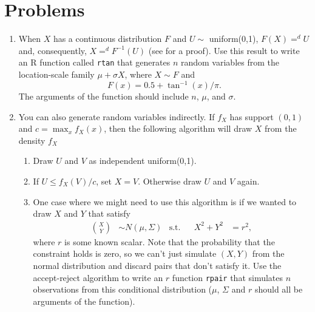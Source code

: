 

\chapter{Problems}

\begin{enumerate}

\item When $X$ has a continuous distribution $F$ and $U \sim$
  uniform(0,1), $F(X) =^d U$ and, consequently, $X =^d F^{-1}(U)$ (see
  \citealt[Theorem 2.1.10]{CB02} for a proof).  Use this result to
  write an R function called \texttt{rtan} that generates $n$ random
  variables from the location-scale family $\mu + \sigma X$, where $X
  \sim F$ and
  \begin{equation*}
    F(x) = 0.5 + \tan^{-1}(x)/\pi.
  \end{equation*}
  The arguments of the function should include $n$, $\mu$, and $\sigma$.

\item You can also generate random variables indirectly.  If $f_X$ has
  support $(0,1)$ and $c = \max_x f_X(x)$, then the following
  algorithm will draw $X$ from the density $f_X$ \citep[see][Section
  5.6.2]{CB02}
  \begin{enumerate}
  \item Draw $U$ and $V$ as independent uniform(0,1).
  \item If $U \leq f_X(V) / c$, set $X = V$.  Otherwise draw $U$ and $V$
    again.
  \item One case where we might need to use this algorithm is if we
    wanted to draw $X$ and $Y$ that satisfy
    \begin{align*}
      \binom{X}{Y} &\sim N(\mu,\Sigma) & \text{s.t.}&& X^2 + Y^2 &= r^2,
    \end{align*}
    where $r$ is some known scalar.  Note that the probability that
    the constraint holds is zero, so we can't just simulate $(X,Y)$
    from the normal distribution and discard pairs that don't satisfy
    it.  Use the accept-reject algorithm to write an $r$ function
    \texttt{rpair} that simulates $n$ observations from this
    conditional distribution ($\mu$, $\Sigma$ and $r$ should all be arguments
    of the function).
  \end{enumerate}


\end{enumerate}
